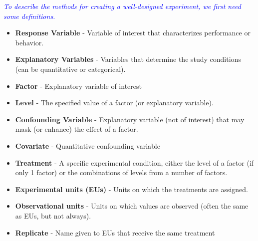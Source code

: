 \noindent\textit{\textcolor{blue}{To describe the methods for creating a well-designed experiment, we first need some definitions.}}
\begin{itemize}
\item \textbf{Response Variable} - Variable of interest that characterizes performance or behavior.
\item \textbf{Explanatory Variables} - Variables that determine the study conditions (can be quantitative or categorical).
\item \textbf{Factor} - Explanatory variable of interest
\item \textbf{Level} -	The specified value of a factor (or explanatory variable).
\item \textbf{Confounding Variable} - Explanatory variable (not of interest) that may mask (or enhance) the effect of a factor.
\item \textbf{Covariate} - Quantitative confounding variable 
\item \textbf{Treatment} - A specific experimental condition, either the level of a factor (if only 1 factor) or the combinations of levels from a number of factors.
\item \textbf{Experimental units (EUs)} - Units on which the treatments are assigned.
\item \textbf{Observational units} - Units on which values are observed (often the same as EUs, but not always).
\item \textbf{Replicate} - Name given to EUs that receive the same treatment
\end{itemize}

